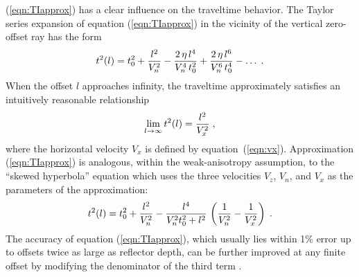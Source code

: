 (\ref{eqn:TIapprox}) has a clear influence on the traveltime behavior.
The Taylor series expansion of equation (\ref{eqn:TIapprox}) in the vicinity 
of the vertical zero-offset ray has the form
\begin{equation}
t^2(l) = t_0^2 + {l^2 \over V_n^2} - {{2\,\eta\,l^4} \over 
{V_n^4\,t_0^2}} + {{2\,\eta\,l^6} \over 
{V_n^6\,t_0^4}} - \ldots \;.
\label{eqn:TItaylor}
\end{equation}
When the offset $l$ approaches infinity, the traveltime
approximately satisfies an intuitively reasonable relationship
\begin{equation}
\lim_{l \rightarrow \infty} t^2(l) = {l^2 \over V_x^2}\;,
\label{eqn:hlimit}
\end{equation}
where the horizontal velocity $V_x$ is defined by equation~(\ref{eqn:vx}).  
Approximation (\ref{eqn:TIapprox}) is analogous, within the weak-anisotropy assumption, to the ``skewed hyperbola'' equation
\cite[]{GEO54-12-15641574} which uses the three velocities $V_z$, $V_n$,
and $V_x$ as the parameters of the approximation:
\begin{equation}
t^2(l) = t_0^2 + {l^2 \over V_n^2} - {{l^4} \over 
{V_n^2 t_0^2 + l^2}}\,
\left({1 \over V_n^2} - {1 \over V_x^2}\right)\;.
\label{eqn:BHapprox}
\end{equation}
The accuracy of equation (\ref{eqn:TIapprox}), which usually lies within 1\% error up to offsets twice as large as reflector depth, can be further improved at any
finite offset by modifying the denominator of the third term
\cite[]{aktsvan,grektsvan}.


